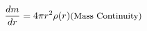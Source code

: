 \begin{eqnarray}
    \frac{dm}{dr} = 4\pi r^2 \rho(r) & \textrm{\small  (Mass Continuity)}
\end{eqnarray}